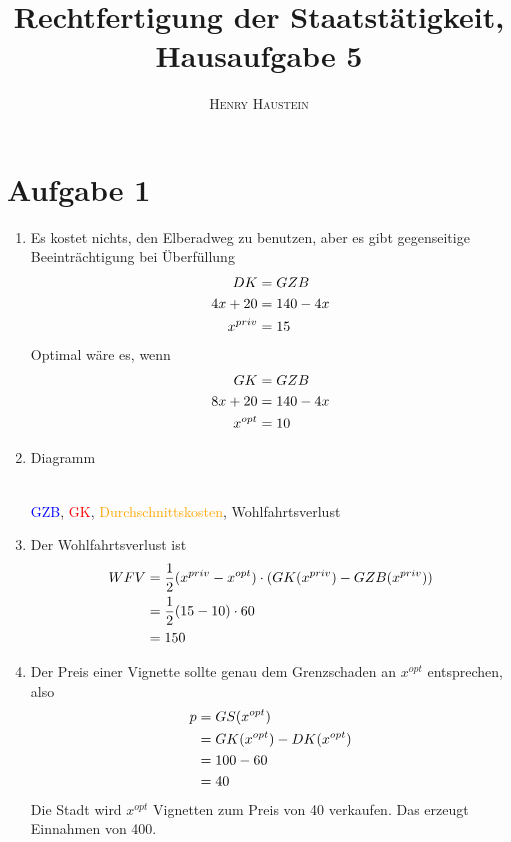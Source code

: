 \documentclass{article}
\title{\textbf{Rechtfertigung der Staatstätigkeit, Hausaufgabe 5}}
\author{\textsc{Henry Haustein}}
\date{}
\begin{document}
	\maketitle
	
	\section*{Aufgabe 1}
	\begin{enumerate}[label=(\alph*)]
		\item Es kostet nichts, den Elberadweg zu benutzen, aber es gibt gegenseitige Beeinträchtigung bei Überfüllung
		\begin{align}
			DK &= GZB \notag \\
			4x+20 &= 140 - 4x \notag \\
			x^{priv} &= 15 \notag
		\end{align}
		Optimal wäre es, wenn
		\begin{align}
			GK &= GZB \notag \\
			8x+20 &= 140-4x \notag \\
			x^{opt} &= 10 \notag
		\end{align}
		\item Diagramm
		\begin{center}
			 \\
			\textcolor{blue}{GZB}, \textcolor{red}{GK}, \textcolor{orange}{Durchschnittskosten}, \textcolor{green!80!black}{Wohlfahrtsverlust}
		\end{center}
		\item Der Wohlfahrtsverlust ist
		\begin{align}
			WFV &= \frac{1}{2}(x^{priv} - x^{opt})\cdot (GK(x^{priv}) - GZB(x^{priv})) \notag \\
			&= \frac{1}{2}(15-10)\cdot 60 \notag \\
			&= 150 \notag
		\end{align}
		\item Der Preis einer Vignette sollte genau dem Grenzschaden an $x^{opt}$ entsprechen, also
		\begin{align}
			p &= GS(x^{opt}) \notag \\
			&= GK(x^{opt}) - DK(x^{opt}) \notag \\
			&= 100 - 60 \notag \\
			&= 40 \notag
		\end{align}
		Die Stadt wird $x^{opt}$ Vignetten zum Preis von 40 verkaufen. Das erzeugt Einnahmen von 400.
	\end{enumerate}
	
\end{document}
